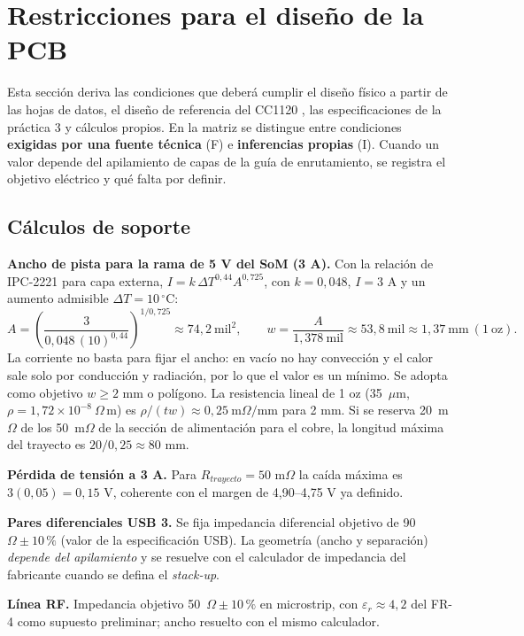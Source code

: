 \documentclass[11pt,letterpaper]{article}
\begin{document}
\section{Restricciones para el diseño de la PCB}
\label{sec:dfm}
Esta sección deriva las condiciones que deberá cumplir el diseño físico a partir de las hojas de datos, el diseño de referencia del CC1120 \cite{cc1120em}, las especificaciones de la práctica 3 \cite{lab3} y cálculos propios. En la matriz se distingue entre condiciones \textbf{exigidas por una fuente técnica} (F) e \textbf{inferencias propias} (I). Cuando un valor depende del apilamiento de capas de la guía de enrutamiento, se registra el objetivo eléctrico y qué falta por definir.

\subsection{Cálculos de soporte}
\textbf{Ancho de pista para la rama de 5 V del SoM (3 A).} Con la relación de IPC-2221 para capa externa, $I=k\,\Delta T^{0{,}44}A^{0{,}725}$, con $k=0{,}048$, $I=3$ A y un aumento admisible $\Delta T=10\,^\circ$C:
\begin{equation}
A=\left(\frac{3}{0{,}048\,(10)^{0{,}44}}\right)^{1/0{,}725}\approx74{,}2\ \mathrm{mil}^2,\qquad
w=\frac{A}{1{,}378\ \mathrm{mil}}\approx53{,}8\ \mathrm{mil}\approx1{,}37\ \mathrm{mm}\ (1\ \mathrm{oz}).
\end{equation}
La corriente no basta para fijar el ancho: en vacío no hay convección y el calor sale solo por conducción y radiación, por lo que el valor es un mínimo. Se adopta como objetivo $w\geq2$ mm o polígono. La resistencia lineal de 1 oz (35~$\mu$m, $\rho=1{,}72\times10^{-8}\ \Omega\,$m) es $\rho/(tw)\approx0{,}25\ \mathrm{m}\Omega/\mathrm{mm}$ para 2 mm. Si se reserva 20~m$\Omega$ de los 50~m$\Omega$ de la sección de alimentación para el cobre, la longitud máxima del trayecto es $20/0{,}25\approx80$ mm.

\textbf{Pérdida de tensión a 3 A.} Para $R_{trayecto}=50$ m$\Omega$ la caída máxima es $3(0{,}05)=0{,}15$ V, coherente con el margen de 4,90--4,75 V ya definido.

\textbf{Pares diferenciales USB 3.} Se fija impedancia diferencial objetivo de 90~$\Omega\pm10\,\%$ (valor de la especificación USB). La geometría (ancho y separación) \emph{depende del apilamiento} y se resuelve con el calculador de impedancia del fabricante cuando se defina el \emph{stack-up}.

\textbf{Línea RF.} Impedancia objetivo 50~$\Omega\pm10\,\%$ en microstrip, con $\varepsilon_r\approx4{,}2$ del FR-4 como supuesto preliminar; ancho resuelto con el mismo calculador.
\end{document}
